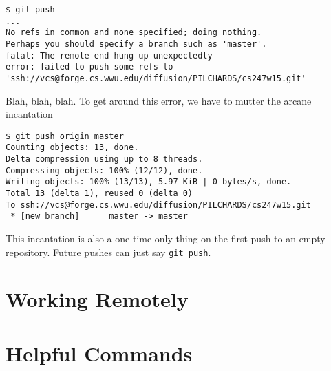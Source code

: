 \documentclass[12pt]{article}
\begin{document}
\begin{verbatim}
$ git push
...
No refs in common and none specified; doing nothing.
Perhaps you should specify a branch such as 'master'.
fatal: The remote end hung up unexpectedly
error: failed to push some refs to 'ssh://vcs@forge.cs.wwu.edu/diffusion/PILCHARDS/cs247w15.git'
\end{verbatim}

Blah, blah, blah.  To get around this error, we have to mutter the arcane incantation

\begin{verbatim}
$ git push origin master
Counting objects: 13, done.
Delta compression using up to 8 threads.
Compressing objects: 100% (12/12), done.
Writing objects: 100% (13/13), 5.97 KiB | 0 bytes/s, done.
Total 13 (delta 1), reused 0 (delta 0)
To ssh://vcs@forge.cs.wwu.edu/diffusion/PILCHARDS/cs247w15.git
 * [new branch]      master -> master
\end{verbatim}

This incantation is also a one-time-only thing on the first push to an empty repository.  Future pushes can just say \verb|git push|.

\section{Working Remotely}

\section{Helpful Commands}
\end{document}
